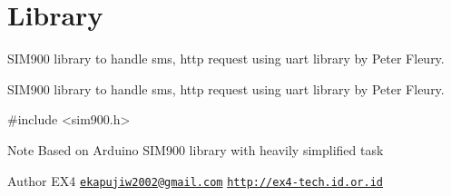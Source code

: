 \hypertarget{group___s_i_m900}{\section{Library}
\label{group___s_i_m900}
}


S\-I\-M900 library to handle sms, http request using uart library by Peter Fleury.  


S\-I\-M900 library to handle sms, http request using uart library by Peter Fleury. 
\begin{DoxyCode}
\textcolor{preprocessor}{ #include <sim900.h>} 
\end{DoxyCode}


\begin{DoxyNote}{Note}
Based on Arduino S\-I\-M900 library with heavily simplified task 
\end{DoxyNote}
\begin{DoxyAuthor}{Author}
E\-X4 \href{mailto:ekapujiw2002@gmail.com}{\tt ekapujiw2002@gmail.\-com} \href{http://ex4-tech.id.or.id}{\tt http\-://ex4-\/tech.\-id.\-or.\-id} 
\end{DoxyAuthor}
